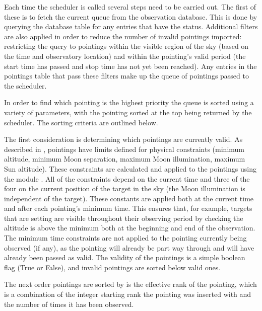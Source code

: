 \begin{colsection}
\begin{colsection}
Each time the scheduler is called several steps need to be carried out. The first of these is to fetch the current queue from the observation database. This is done by querying the database  table for any entries that have the  status. Additional filters are also applied in order to reduce the number of invalid pointings imported: restricting the query to pointings within the visible region of the sky (based on the time and observatory location) and within the pointing's valid period (the start time has passed and stop time has not yet been reached). Any entries in the pointings table that pass these filters make up the queue of pointings passed to the scheduler.

In order to find which pointing is the highest priority the queue is sorted using a variety of parameters, with the pointing sorted at the top being returned by the scheduler. The sorting criteria are outlined below.

\newpage

The first consideration is determining which pointings are currently valid. As described in , pointings have limits defined for physical constraints (minimum altitude, minimum Moon separation, maximum Moon illumination, maximum Sun altitude). These constraints are calculated and applied to the pointings using the   module \citep{astroplan}. All of the constraints depend on the current time and three of the four on the current position of the target in the sky (the Moon illumination is independent of the target). These constants are applied both at the current time and after each pointing's minimum time. This ensures that, for example, targets that are setting are visible throughout their observing period by checking the altitude is above the minimum both at the beginning and end of the observation. The minimum time constraints are not applied to the pointing currently being observed (if any), as the pointing will already be part way through and will have already been passed as valid. The validity of the pointings is a simple boolean flag (True or False), and invalid pointings are sorted below valid ones.

The next order pointings are sorted by is the effective rank of the pointing, which is a combination of the integer starting rank the pointing was inserted with and the number of times it has been observed.


\end{colsection}
\end{colsection}
